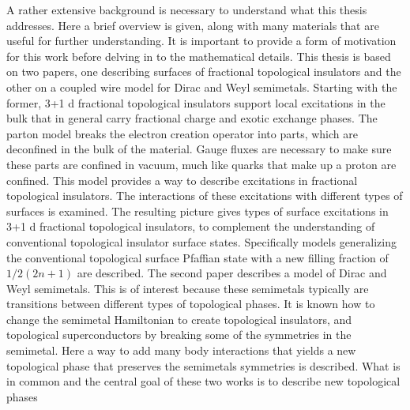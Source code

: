 A rather extensive background is necessary to understand what this thesis addresses. Here a brief overview is given, along with many materials that are useful for further understanding. It is important to provide a form of motivation for this work before delving in to the mathematical details. This thesis is based on two papers, one describing surfaces of fractional topological insulators and the other on a coupled wire model for Dirac and Weyl semimetals. Starting with the former, 3+1 d fractional topological insulators support local excitations in the bulk that in general carry fractional charge and exotic exchange phases. The parton model breaks the electron creation operator into parts, which are deconfined in the bulk of the material. Gauge fluxes are necessary to make sure these parts are confined in vacuum, much like quarks that make up a proton are confined. This model provides a way to describe excitations in fractional topological insulators. The interactions of these excitations with different types of surfaces is examined. The resulting picture gives types of surface excitations in 3+1 d fractional topological insulators, to complement the understanding of conventional topological insulator surface states. Specifically models generalizing the conventional topological surface Pfaffian state with a new filling fraction of $1/2(2n+1)$ are described.
The second paper describes a model of Dirac and Weyl semimetals. This is of interest because these semimetals typically are transitions between different types of topological phases. It is known how to change the semimetal Hamiltonian to create topological insulators, and topological superconductors by breaking some of the symmetries in the semimetal. Here a way to add many body interactions that yields a new topological phase that preserves the semimetals symmetries is described. What is in common and the central goal of these two works is to describe new topological phases 